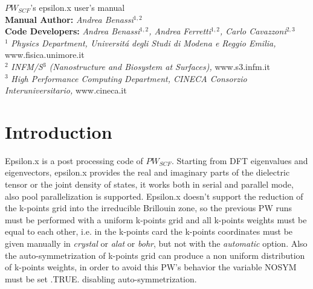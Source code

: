 \documentclass[twocolumn]{article}
\begin{document}
\begin{titlepage}
\Huge
\begin{center}
$PW_{SCF}$'s epsilon.x user's manual\\[4.5cm]
\normalsize
\vspace{10.5cm}
\textbf{Manual Author:}
\emph{Andrea Benassi}$^{1,2}$\\[0.3cm]
\textbf{Code Developers:}
\emph{Andrea Benassi$^{1,2}$, Andrea Ferretti$^{1,2}$, Carlo Cavazzoni$^{2,3}$}\\[1cm]
$^{1}$ \emph{Physics Department, Universit\'a degli Studi di Modena e Reggio Emilia,} www.fisica.unimore.it\\
$^{2}$ \emph{INFM/S$^{3}$ (Nanostructure and Biosystem at Surfaces),} www.s3.infm.it\\
$^{3}$ \emph{High Performance Computing Department, CINECA Consorzio Interuniversitario,} www.cineca.it\\
\end{center}
\end{titlepage}
\newpage
\section{Introduction}
Epsilon.x is a post processing code of $PW_{SCF}$. Starting from DFT eigenvalues and eigenvectors,
epsilon.x provides the real and imaginary parts of the dielectric tensor or the joint density of states, it works both in serial and
parallel mode, also pool parallelization is supported.
Epsilon.x doesn't support the reduction of the k-points grid into the irreducible Brillouin zone, so the previous PW runs must be
performed with a uniform k-points grid and all k-points weights must be equal to each other, i.e. in the k-points card the k-points
coordinates must be given manually in \emph{crystal} or \emph{alat} or \emph{bohr}, but not with the \emph{automatic} option. Also the
auto-symmetrization of k-points grid can produce a non uniform distribution of k-points weights, in order to avoid this
PW's behavior the variable NOSYM must be set .TRUE. disabling auto-symmetrization.
\end{document}
